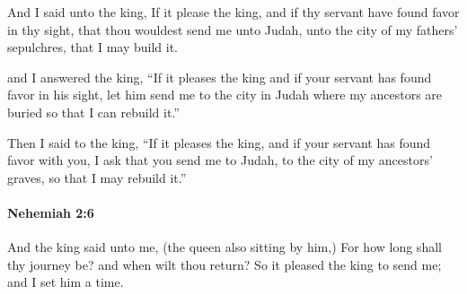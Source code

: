 			\begin{versebox}
					\item[BHS] 
					\item[LXX] 
					\item[ASV] And I said unto the king, If it please the king, and if thy servant have found favor in thy sight, that thou wouldest send me unto Judah, unto the city of my fathers' sepulchres, that I may build it.
					\item[NIV] and I answered the king, “If it pleases the king and if your servant has found favor in his sight, let him send me to the city in Judah where my ancestors are buried so that I can rebuild it.”
					\item[NRSV] Then I said to the king, “If it pleases the king, and if your servant has found favor with you, I ask that you send me to Judah, to the city of my ancestors’ graves, so that I may rebuild it.”
			\end{versebox}

		\paragraph{Nehemiah 2:6} %
			\label{NEHEMIAH-2-6}

			And the king said unto me, (the queen also sitting by him,) For how long shall thy journey be? and when wilt thou return? So it pleased the king to send me; and I set him a time.

